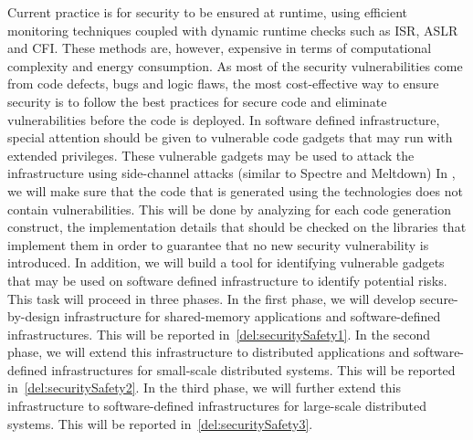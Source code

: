 \begin{Workpackage}{\thewpno}
\begin{Task}
\TaskResults{
\ref{del:securitySafety1}
\ref{del:securitySafety2}
\ref{del:securitySafety3}
%
}
\TaskHeader{}
Current practice is for security to be ensured at runtime, using efficient monitoring
techniques coupled with dynamic runtime checks such as ISR, ASLR
and CFI. These methods are, however, expensive in terms of computational
complexity and energy consumption. As most of the security vulnerabilities come from
code defects, bugs and logic flaws, the most cost-effective way to ensure security is
to follow the best practices for secure code and eliminate vulnerabilities
before the code is deployed. In software defined infrastructure, special attention should be given to vulnerable code gadgets that may run with extended privileges. These vulnerable gadgets may be used to attack the infrastructure using side-channel attacks (similar to Spectre and Meltdown)
In \theTask, we will make sure that the code that is generated using the  \TheProject{} technologies does not contain vulnerabilities. This will be done by analyzing for each code generation construct, the implementation details that should be checked on the libraries that implement them in order to guarantee that no new security vulnerability is introduced.
 In addition, we will build a tool for identifying vulnerable gadgets that may be used on software defined infrastructure to identify potential risks. This task will proceed in three phases. In the first phase, we will develop secure-by-design infrastructure for shared-memory applications and \TheProject{} software-defined infrastructures. This will be reported in~\ref{del:securitySafety1}. In the second phase, we will extend this infrastructure to distributed applications and software-defined infrastructures for small-scale distributed systems. This will be reported in~\ref{del:securitySafety2}. In the third phase, we will further extend this infrastructure to software-defined infrastructures for large-scale distributed systems. This will be reported in~\ref{del:securitySafety3}.
\end{Task}


\end{Workpackage}
